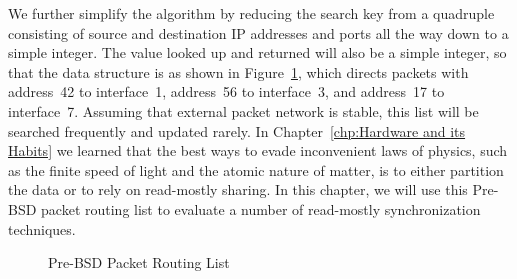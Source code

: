 We further simplify the algorithm by reducing the search key from
a quadruple consisting of source and destination IP addresses and
ports all the way down to a simple integer.
The value looked up and returned will also be a simple integer,
so that the data structure is as shown in
Figure~\ref{fig:defer:Pre-BSD Packet Routing List}, which
directs packets with address~42 to interface~1, address~56 to
interface~3, and address~17 to interface~7.
Assuming that external packet network is stable,
this list will be searched frequently and updated rarely.
In Chapter~\ref{chp:Hardware and its Habits}
we learned that the best ways to evade inconvenient laws of physics, such as
the finite speed of light and the atomic nature of matter, is to
either partition the data or to rely on read-mostly sharing.
In this chapter, we will use this Pre-BSD packet routing
list to evaluate a number of read-mostly synchronization techniques.
\fi

\begin{figure}[tb]
\begin{center}
\end{center}
\caption{Pre-BSD Packet Routing List}
\label{fig:defer:Pre-BSD Packet Routing List}
\end{figure}

